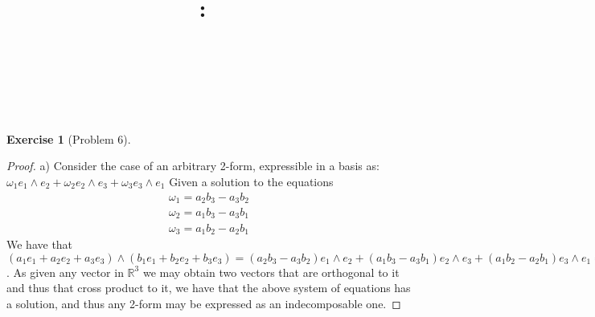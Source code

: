 \documentclass{article}
\title{
    \vspace{2in}
    \textmd{\textbf{\hmwkClass:\ \hmwkTitle}}\\
    \vspace{0.1in}
    \textmd{\hmwkDueDate} \\
    \vspace{0.2in}\large{\textit{\hmwkClassInstructor\  }}
    \vspace{2in}
}
\author{\hmwkAuthorName}
\date{}
\newtheorem{exercise}{Exercise}
\begin{document}
\maketitle

\newpage

\begin{exercise}[Problem 6]
\end{exercise}
\begin{proof}
  a) Consider the case of an arbitrary 2-form, expressible in a basis as: $\omega_{1}e_{1}\wedge e_{2} + \omega_{2} e_{2}\wedge e_{3} + \omega_{3} e_{3} \wedge e_{1}$ Given a solution to the equations
  \begin{align*}
    \omega_{1} = a_{2}b_{3} - a_{3}b_{2} \\
    \omega_{2} = a_{1}b_{3} - a_{3}b_{1} \\
    \omega_{3} = a_{1}b_{2} - a_{2}b_{1} 
  \end{align*}
  We have that $(a_{1}e_{1} + a_{2}e_{2} + a_{3}e_{3}) \wedge (b_{1}e_{1} + b_{2}e_{2} + b_{3}e_{3}) = (a_{2}b_{3} - a_{3}b_{2})e_{1}\wedge e_{2} + (a_{1}b_{3} - a_{3}b_{1}) e_{2} \wedge e_{3} + (a_{1}b_{2} - a_{2}b_{1})e_{3}\wedge e_{1} = \omega_{1}e_{1}\wedge e_{2} + \omega_{2} e_{2}\wedge e_{3} + \omega_{3} e_{3} \wedge e_{1}$. As given any vector in $\mathbb{R}^{3}$ we may obtain two vectors that are orthogonal to it and thus that cross product to it, we have that the above system of equations has a solution, and thus any 2-form may be expressed as an indecomposable one. 
\end{proof}
\end{document}
